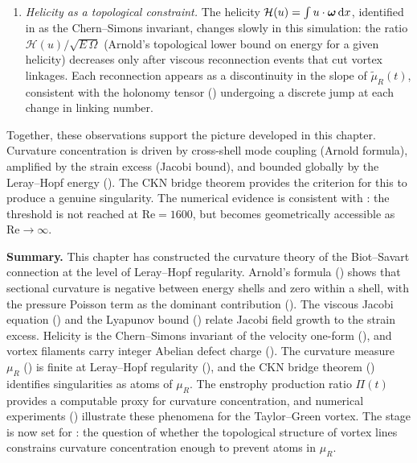 \begin{enumerate}[label=(\roman*)]
  \item \textit{Helicity as a topological constraint.}
        The helicity $\mathcal{H}(u) = \int u \cdot \boldsymbol{\omega}\,\mathrm{d} x$, identified in
         as the Chern--Simons invariant, changes slowly in
        this simulation: the ratio $\mathcal{H}(u)/\sqrt{E\,\Omega}$ (Arnold's
        topological lower bound on energy for a given helicity) decreases only
        after viscous reconnection events that cut vortex linkages.
        Each reconnection appears as a discontinuity in the slope of $\tilde{\mu}_R(t)$,
        consistent with the holonomy tensor () undergoing a
        discrete jump at each change in linking number.
\end{enumerate}

Together, these observations support the picture developed in this chapter.
Curvature concentration is driven by cross-shell mode coupling (Arnold formula),
amplified by the strain excess (Jacobi bound), and bounded globally by the
Leray--Hopf energy ().  The CKN bridge theorem
provides the criterion for this to produce a genuine singularity.
The numerical evidence is consistent with : the threshold
is not reached at $\mathrm{Re} = 1600$, but becomes geometrically accessible
as $\mathrm{Re} \to \infty$.

\bigskip

\noindent\textbf{Summary.}
This chapter has constructed the curvature theory of the Biot--Savart connection at the
level of Leray--Hopf regularity.
Arnold's formula () shows that sectional curvature is
negative between energy shells and zero within a shell, with the pressure Poisson term
as the dominant contribution ().
The viscous Jacobi equation () and the Lyapunov bound
() relate Jacobi field growth to the strain excess.
Helicity is the Chern--Simons invariant of the velocity one-form
(), and vortex filaments carry integer Abelian defect charge
().
The curvature measure $\mu_R$ () is finite at
Leray--Hopf regularity (), and the CKN bridge
theorem () identifies singularities as atoms of $\mu_R$.
The enstrophy production ratio $\Pi(t)$ provides a computable proxy for curvature
concentration, and numerical experiments () illustrate these
phenomena for the Taylor--Green vortex.
The stage is now set for : the question of whether the
topological structure of vortex lines constrains curvature concentration enough
to prevent atoms in $\mu_R$.
